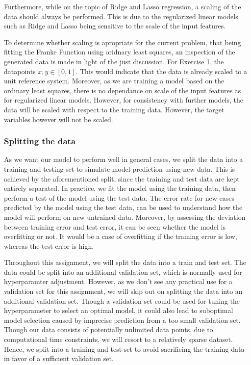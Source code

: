 \documentclass[11pt, a4paper]{article}
\begin{document}
Furthermore, while on the topic of Ridge and Lasso regression, a scaling of the data should always be performed. This is due to the regularized linear models such as Ridge and Lasso being sensitive to the scale of the input features. \cite{Geron2019}

To determine whether scaling is apropriate for the current problem, that being fitting the Franke Function using oridnary least squares, an inspection of the generated data is made in light of the just discussion. For Exercise 1, the datapoints $x,y \in \left[0,1\right]$. This would indicate that the data is already scaled to a unit reference system. Moreover, as we are training a model based on the ordinary least squares, there is no dependance on scale of the input features as for regularized linear models. However, for consistency with further models, the data will be scaled with respect to the training data. However, the target variables however will not be scaled.

\subsubsection*{Splitting the data}
As we want our model to perform well in general cases, we split the data into a training and testing set to simulate model prediction using new data. This is achieved by the aforementioned split, since the training and test data are kept entirely separated. In practice, we fit the model using the training data, then perform a test of the model using the test data. The error rate for new cases predicted by the model using the test data, can be used to understand how the model will perform on new untrained data. \cite{Geron2019} Moreover, by assessing the deviation between training error and test error, it can be seen whether the model is overfitting or not. It would be a case of overfitting if the training error is low, whereas the test error is high.

Throughout this assignment, we will split the data into a train and test set. The data could be split into an additional validation set, which is normally used for hyperparamter adjustment. However, as we don't see any practical use for a validation set for this assignment, we will skip out on splitting the data into an additional validation set. Though a validation set could be used for tuning the hyperparameter to select an optimal model, it could also lead to suboptimal model selection caused by imprecise prediction from a too small validation set. \cite{Geron2019} Though our data consists of potentially unlimited data points, due to computational time constraints, we will resort to a relatively sparse dataset. Hence, we split into a training and test set to avoid sacrificing the training data in favor of a sufficient validation set.
\end{document}
